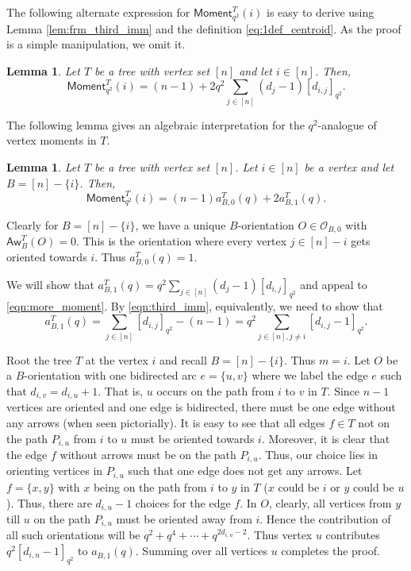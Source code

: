 \documentclass[12pt]{article}
\def\eod{\vrule height 6pt width 5pt depth 0pt}
\newenvironment{proof}{\noindent {\bf Proof:} \hspace{.2em}}
                      {\hspace*{\fill}{\eod}}
\newtheorem{lemma}[theorem]{Lemma}
\newcommand{\ssM}{  \mathsf{Moment}}
\newcommand{\sO}{  \mathcal{ O}}
\newcommand{\awy}{\mathsf{Aw}}
\begin{document}
The following alternate expression for $\ssM_{q^2}^T(i)$ is easy 
to derive using Lemma \ref{lem:frm_third_imm} and the definition
\eqref{eq:1def_centroid}.  As the proof
is a simple manipulation, we omit it.


\begin{lemma}
\label{lem:eqv_def}
Let $T$ be a tree with vertex set $[n]$ and let $i \in [n]$.  Then,
\begin{equation}
  \label{eqn:more_moment}
\ssM_{q^2}^T(i)=(n-1)+2q^2 \sum_{j \in [n]} (d_j-1) [d_{i,j}]_{q^2}.
\end{equation}
\end{lemma}

The following lemma gives an algebraic interpretation for
the $q^2$-analogue of vertex moments in $T$.

\begin{lemma}
\label{lem:alternate_def}
Let $T$ be a tree with vertex set $[n]$. 
Let  $i\in [n]$ be a vertex and let $B=[n]-\{i\}$. 
Then, 
\begin{equation}
  \label{eqn:moment}
\ssM_{q^2}^T(i)=(n-1)a_{B,0}^{T}(q)+2a_{B,1}^{T}(q).
\end{equation}
\end{lemma}
\begin{proof}
Clearly for $B=[n]-\{i\}$, 
we have a unique $B$-orientation $O\in \sO_{B,0}$ with $\awy_B^{T}(O)=0$.
This is the orientation where every vertex $j \in [n] - i$ gets oriented
towards $i$.  Thus $a_{B,0}^{T}(q)=1$.

We will show that 
$a_{B,1}^{T}(q)= q^2\sum_{j \in [n]}(d_j -1)[d_{i,j}]_{q^2}$
and appeal to \eqref{eqn:more_moment}.  
By \eqref{eqn:third_imm}, equivalently, we need to show that
\begin{equation*}
a_{B,1}^{T}(q)  =  \sum_{j \in [n]} [d_{i,j}]_{q^2} - (n-1) 
 =  q^2 \sum_{j \in [n], j \not= i} [d_{i,j}-1]_{q^2}.
\end{equation*}

Root the tree $T$ at the vertex $i$ and recall $B = [n] - \{i \}$.  
Thus $m = i$.
Let $O$ be a $B$-orientation with one bidirected arc $e = \{u,v\}$
where we label the edge $e$ such that $d_{i,v} = d_{i,u} + 1$.  
That is, $u$ occurs on the path from $i$ to $v$ in $T$.
Since $n-1$ vertices are oriented and one edge is bidirected,
there must be one edge without any arrows (when seen pictorially).
It is easy to see that all edges $f \in T$ not on the path $P_{i,u}$
from $i$ to $u$ must be oriented towards $i$.  Moreover, it is clear
that the edge $f$ without arrows must be on the path $P_{i,u}$.
Thus, our choice
lies in orienting vertices in $P_{i,u}$ such that one edge does
not get any arrows.  
Let $f = \{x,y\}$ with $x$ being on the path from $i$ to $y$ in $T$
($x$ could be $i$ or $y$ could be $u$).  Thus, there are $d_{i,u}-1$ 
choices for the edge $f$.  In $O$, clearly, all
vertices from $y$ till $u$ on the path $P_{i,u}$ must be oriented
away from $i$.  Hence the contribution of all such orientations 
will be $q^2 + q^4 + \cdots + q^{2d_{i,u}-2}$.
Thus vertex $u$ contributes $q^2 [d_{i,u}-1]_{q^2}$ to
$a_{B,1}^{ }(q)$.  Summing over all vertices $u$ completes the
proof.
\end{proof}
\end{document}

